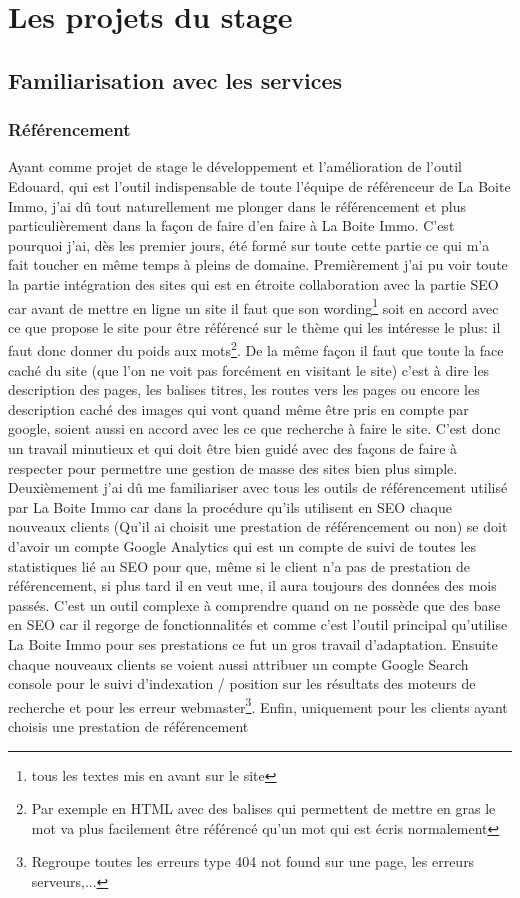 \documentclass[12pt]{article}
\begin{document}
\newpage

\section{Les projets du stage}
\subsection{Familiarisation avec les services}

\subsubsection{Référencement}

Ayant comme projet de stage le développement et l'amélioration de l'outil Edouard, qui est l'outil indispensable de toute l'équipe de référenceur de La Boite Immo, j'ai dû tout naturellement me plonger dans le référencement et plus particulièrement dans la façon de faire d'en faire à La Boite Immo. C'est pourquoi j'ai, dès les premier jours, été formé sur toute cette partie ce qui m'a fait toucher en même temps à pleins de domaine. Premièrement j'ai pu voir toute la partie intégration des sites qui est en étroite collaboration avec la partie SEO car avant de mettre en ligne un site il faut que son wording\footnote{tous les textes mis en avant sur le site} soit en accord avec ce que propose le site pour être référencé sur le thème qui les intéresse le plus: il faut donc donner du poids aux mots\footnote{Par exemple en HTML avec des balises qui permettent de mettre en gras le mot va plus facilement être référencé qu'un mot qui est écris normalement}. De la même façon il faut que toute la face caché du site (que l'on ne voit pas forcément en visitant le site) c'est à dire les description des pages, les balises titres, les routes vers les pages ou encore les description caché des images qui vont quand même être pris en compte par google, soient aussi en accord avec les ce que recherche à faire le site. C'est donc un travail minutieux et qui doit être bien guidé avec des façons de faire à respecter pour permettre une gestion de masse des sites bien plus simple. Deuxièmement j'ai dû me familiariser avec tous les outils de référencement utilisé par La Boite Immo car dans la procédure qu'ils utilisent en SEO chaque nouveaux clients (Qu'il ai choisit une prestation de référencement ou non) se doit d'avoir un compte Google Analytics qui est un compte de suivi de toutes les statistiques lié au SEO pour que, même si le client n'a pas de prestation de référencement, si plus tard il en veut une, il aura toujours des données des mois passés. C'est un outil complexe à comprendre quand on ne possède que des base en SEO car il regorge de fonctionnalités et comme c'est l'outil principal qu'utilise La Boite Immo pour ses prestations ce fut un gros travail d'adaptation. Ensuite chaque nouveaux clients se voient aussi attribuer un compte Google Search console pour le suivi d'indexation / position sur les résultats des moteurs de recherche et pour les erreur webmaster\footnote{Regroupe toutes les erreurs type 404 not found sur une page, les erreurs serveurs,...}. Enfin, uniquement pour les clients ayant choisis une prestation de référencement 
\end{document}
